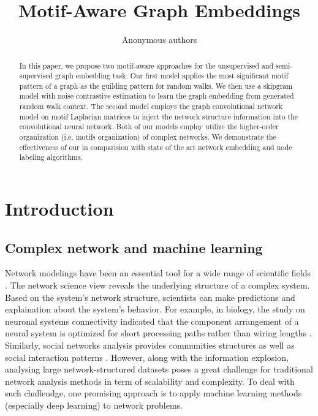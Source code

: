 \documentclass{article}
\title{Motif-Aware Graph Embeddings}
\author{Anonymous authors}
\theoremstyle{definition}
\begin{document}
\maketitle

\begin{abstract}
  In this paper, we propose two motif-aware approaches for the unsupervised 
  and semi-supervised graph embedding task. Our first model applies the most
  significant motif pattern of a graph as the guilding pattern for random walks.
  We then use a skipgram model with noise contrastive estimation to learn the
  graph embedding from generated random walk context. The second model employs the 
  graph convolutional network model on motif Laplacian matrices to inject
  the network structure information into the convolutional neural network.
  Both of our models employ utilize the higher-order organization 
  (i.e. motifs organization) of complex networks. We demonstrate the effectiveness of our 
  in comparision with state of the art network embedding and node labeling
  algorithms.
\end{abstract}

\section{Introduction}

\subsection{Complex network and machine learning}

Network modelings have been an essential tool for a wide
range of scientific fields \cite{physicnet,molecule,youtube,motifblockmilo,juremotif}.
The network science view reveals the underlying structure 
of a complex system. Based on the system's network structure, 
scientists can make predictions and explaination
about the system's behavior. For example, in biology, the
study on neuronal systems connectivity indicated
that the component arrangement of a neural system is optimized
for short processing paths rather than wiring lengths \cite{kaiser2006nonoptimal}. 
Similarly, social networks analysis provides communities structures
as well as social interaction patterns \cite{west2014exploiting,barabasi2014network}. 
However, along with the information explosion, analysing large network-structured
datasets poses a great challenge for traditional network analysis methods
in term of scalability and complexity. To deal with such challendge,
one promising approach is to apply machine learning methods (especially
deep learning) to network problems.
\end{document}
